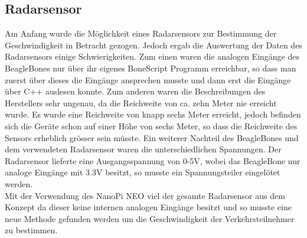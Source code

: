 \subsection{Radarsensor}
Am Anfang wurde die Möglichkeit eines Radarsensors zur Bestimmung der Geschwindigkeit in Betracht gezogen. Jedoch ergab die Auswertung der Daten des Radarsensors einige Schwierigkeiten. Zum einen waren die analogen Eingänge des BeagleBones nur über ihr eigenes BoneScript Programm erreichbar, so dass man zuerst über dieses die Eingänge ansprechen musste und dann erst die Eingänge über C++ auslesen konnte. Zum anderen waren die Beschreibungen des Herstellers sehr ungenau, da die Reichweite von ca. zehn Meter nie erreicht wurde. Es wurde eine Reichweite von knapp sechs Meter erreicht, jedoch befinden sich die Geräte schon auf einer Höhe von sechs Meter, so dass die Reichweite des Sensors erheblich grösser sein müsste. Ein weiterer Nachteil des BeagleBones und dem verwendeten Radarsensor waren die unterschiedlichen Spannungen. Der Radarsensor lieferte eine Ausgangsspannung von 0-5V, wobei das BeagleBone nur analoge Eingänge mit 3.3V besitzt, so musste ein Spannungsteiler eingelötet werden. \\
Mit der Verwendung des NanoPi NEO viel der gesamte Radarsensor aus dem Konzept da dieser keine internen analogen Eingänge besitzt und so musste eine neue Methode gefunden werden um die Geschwindigkeit der Verkehrsteilnehmer zu bestimmen.
